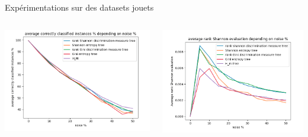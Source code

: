 \documentclass[usenames,dvipsnames]{beamer}
\begin{document}
\begin{frame}{Expérimentations sur des datasets jouets}
    \begin{columns}
        \begin{column}{0.5\textwidth}
            \centering
            \includegraphics[width=\textwidth]{acc_5.png}
        \end{column}
        \begin{column}{0.5\textwidth}
            \centering
            \includegraphics[width=\textwidth]{shannon_eval_5.png}
        \end{column}
    \end{columns}
\end{frame}
\end{document}

